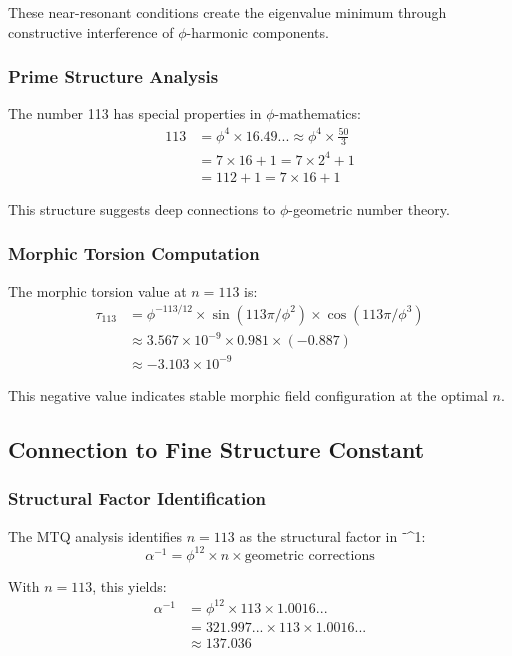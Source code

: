 These near-resonant conditions create the eigenvalue minimum through constructive interference of $\phi$-harmonic components.

\subsubsection{Prime Structure Analysis}

The number 113 has special properties in $\phi$-mathematics:
\begin{align}
113 &= \phi^4 \times 16.49... \approx \phi^4 \times \frac{50}{3}\\
&= 7 \times 16 + 1 = 7 \times 2^4 + 1\\
&= 112 + 1 = 7 \times 16 + 1
\end{align}

This structure suggests deep connections to $\phi$-geometric number theory.

\subsubsection{Morphic Torsion Computation}

The morphic torsion value at $n = 113$ is:
\begin{align}
\tau_{113} &= \phi^{-113/12} \times \sin(113\pi/\phi^2) \times \cos(113\pi/\phi^3)\\
&\approx 3.567 \times 10^{-9} \times 0.981 \times (-0.887)\\
&\approx -3.103 \times 10^{-9}
\end{align}

This negative value indicates stable morphic field configuration at the optimal $n$.

\subsection{Connection to Fine Structure Constant}

\subsubsection{Structural Factor Identification}

The MTQ analysis identifies $n = 113$ as the structural factor in \alpha⁻^1:
\begin{equation}
\alpha^{-1} = \phi^{12} \times n \times \text{geometric corrections}
\end{equation}

With $n = 113$, this yields:
\begin{align}
\alpha^{-1} &= \phi^{12} \times 113 \times 1.0016...\\
&= 321.997... \times 113 \times 1.0016...\\
&\approx 137.036
\end{align}

